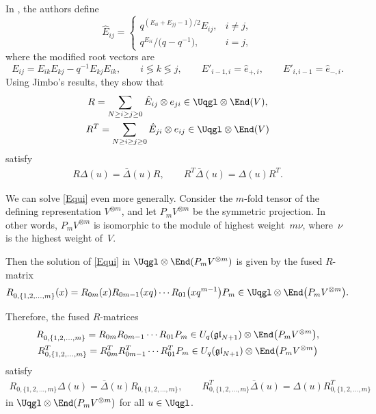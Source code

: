 In \cite{GZB}, the authors define
\[
\hat{E}_{ij}
=
\begin{cases}
q^{(E_{ii}+E_{jj}-1)/2}E_{ij}, & i \neq j,\\
q^{E_{ii}}/\big(q-q^{-1}\big), & i=j,
\end{cases}
\]
where the modified root vectors are
\begin{equation*}
E_{ij}= E_{ik}E_{kj} -q^{- 1} E_{kj}E_{ik},\qquad i \lessgtr k \lessgtr j, \qquad E'_{i-1,i} = \hat{e}_{+,i}, \qquad E'_{i,i-1} = \hat{e}_{-,i}.
\end{equation*}
Using Jimbo's results, they show that
\begin{gather*}
R = \sum_{N \geq i\geq j \geq 0} \hat{E}_{ij} \otimes e_{ji} \in \Uqgl \otimes \End (V),\nonumber\\
R^T = \sum_{N \geq i\geq j \geq 0} \hat{E}_{ji} \otimes e_{ij} \in \Uqgl \otimes \End (V) %
\end{gather*}
satisfy
\begin{gather*}
R\Delta(u) = \bar{\Delta}(u) R,\qquad
R^T\bar{\Delta}(u) = {\Delta}(u) R^T.
\end{gather*}

We can solve \eqref{Equi} even more generally. Consider the $ m $-fold tensor of the defining representation $ V^{\otimes m}$, and let $P_mV^{\otimes m}$ be the symmetric projection. In other words, $P_mV^{\otimes m}$ is isomorphic to the module of highest weight~$m\nu$, where~$\nu$ is the highest weight of~$V$.

Then the solution of \eqref{Equi} in $ \Uqgl \otimes \End (P_m V^{\otimes m}) $ is given by the fused $R$-matrix~\cite{Jimbo1986}%
\begin{gather*} %
R^{}_{0,\{1,2,\dots,m\}}(x)= R_{0m}(x)R_{0m-1}(xq) \cdots R_{01}\big(xq^{ m-1}\big) P_m \in \Uqgl\otimes \End \big(P_m V^{\otimes m}\big) .
\end{gather*}

Therefore, the fused $R$-matrices
\begin{gather*}
R^{}_{0,\{1,2,\dots,m\}} = R_{0m}R_{0m-1}\cdots R_{01}P_m \in U_q(\mathfrak{gl}_{N+1})\otimes \End \big(P_m V^{\otimes m}\big), \\
R^{T}_{0,\{1,2,\dots,m\}} = R^T_{0m}R^T_{0m-1}\cdots R^T_{01}P_m \in U_q(\mathfrak{gl}_{N+1})\otimes \End \big(P_m V^{\otimes m}\big)
\end{gather*}
satisfy
\begin{gather}
R_{0,\{1,2,\dots,m\}} \Delta(u) = \bar{\Delta}(u) R_{0,\{1,2,\dots,m\} },\qquad
R^T_{0,\{1,2,\dots,m\}} \bar{\Delta}(u) = {\Delta}(u) R^T_{0,\{1,2,\dots,m\}}\label{RRel}
\end{gather}
in $\Uqgl \otimes \End (P_m V^{\otimes m})$ for all $u\in \Uqgl$.

